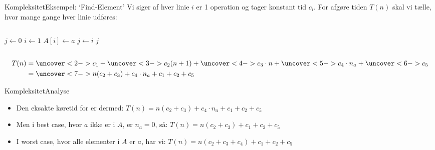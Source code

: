 \documentclass[aspectratio=1610]{beamer}
\begin{document}
\begin{frame}{Kompleksitet}{Eksempel: `Find-Element'}
    Vi siger af hver linie $i$ er 1 operation og tager \alert{konstant} tid $c_i$.
    For afgøre tiden $T(n)$ skal vi tælle, hvor mange gange hver linie udføres:

    \begin{columns}
        \begin{codebox}
            \li $j \gets 0$
            \li \For $i \gets 1$ \To {} \Do 
                \li \If $A[i] \gets a$ \Then 
                    \li $j \gets i$
                \End
            \End
            \li \Return $j$
        \end{codebox}
        
        \begin{codebox}
            \zi {}
            \zi {}
            \zi {}
            \zi {}
            \zi {}
        \end{codebox}
    \end{columns}

    \begin{align*}
        T(n)&= \uncover<2->{c_1} + \uncover<3->{c_2(n + 1)} + \uncover<4->{c_3
        \cdot n}
        + \uncover<5->{c_4 \cdot n_a} + \uncover<6->{c_5} \\
            &= \uncover<7->{n(c_2 + c_3) + c_4 \cdot n_a + c_1 + c_2 + c_5}
    \end{align*}

\end{frame}

\begin{frame}{Kompleksitet}{Analyse}

    \begin{itemize}
        \item Den \alert{eksakte} køretid for  er dermed:
            $T(n) = n(c_2 + c_3) + c_4 \cdot n_a + c_1 + c_2 + c_5$
            \pause \medskip
        \item Men i \alert{best case}, hvor $a$ ikke er i $A$, er $n_a = 0$, så:
            $T(n) = n(c_2 + c_3) + c_1 + c_2 + c_5$
            \pause \medskip
        \item I \alert{worst case}, hvor alle elementer i $A$ er $a$, har vi:
            $T(n) = n(c_2 + c_3 + c_4) + c_1 + c_2 + c_5$
    \end{itemize}
    
\end{frame}
\end{document}
